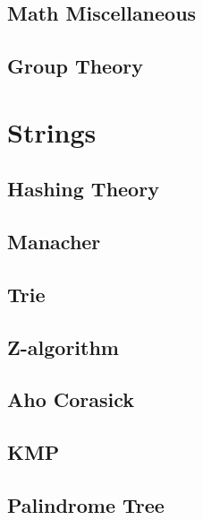 \subsection{Math Miscellaneous}
\raggedbottom
\subsection{Group Theory}
\raggedbottom

\section{Strings}
\subsection{Hashing Theory}
\raggedbottom
\subsection{Manacher}
\raggedbottom
\subsection{Trie}
\raggedbottom
\subsection{Z-algorithm}
\raggedbottom
\subsection{Aho Corasick}
\raggedbottom
\subsection{KMP}
\raggedbottom
\subsection{Palindrome Tree}
\raggedbottom
